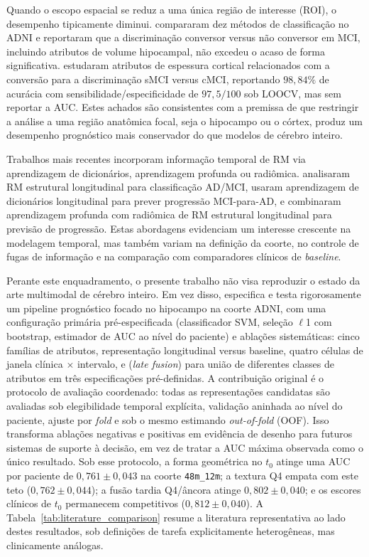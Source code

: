 \documentclass[review]{elsarticle}
\newcommand{\code}[1]{\texttt{#1}}
\begin{document}
	Quando o escopo espacial se reduz a uma única região de interesse (ROI), o desempenho tipicamente diminui. \citet{cuingnet-2011} compararam dez métodos de classificação no ADNI e reportaram que a discriminação conversor versus não conversor em MCI, incluindo atributos de volume hipocampal, não excedeu o acaso de forma significativa. \citet{guo-2017a} estudaram atributos de espessura cortical relacionados com a conversão para a discriminação sMCI versus cMCI, reportando $98,84\%$ de acurácia com sensibilidade/especificidade de $97,5/100$ sob LOOCV, mas sem reportar a AUC. Estes achados são consistentes com a premissa de que restringir a análise a uma região anatômica focal, seja o hipocampo ou o córtex, produz um desempenho prognóstico mais conservador do que modelos de cérebro inteiro.
	
	Trabalhos mais recentes incorporam informação temporal de RM via aprendizagem de dicionários, aprendizagem profunda ou radiômica. \citet{zhang-2019} analisaram RM estrutural longitudinal para classificação AD/MCI, \citet{lin-2020} usaram aprendizagem de dicionários longitudinal para prever progressão MCI-para-AD, e \citet{aghajanian-2025} combinaram aprendizagem profunda com radiômica de RM estrutural longitudinal para previsão de progressão. Estas abordagens evidenciam um interesse crescente na modelagem temporal, mas também variam na definição da coorte, no controle de fugas de informação e na comparação com comparadores clínicos de \textit{baseline}.
	
	Perante este enquadramento, o presente trabalho não visa reproduzir o estado da arte multimodal de cérebro inteiro. Em vez disso, especifica e testa rigorosamente um pipeline prognóstico focado no hipocampo na coorte ADNI, com uma configuração primária pré-especificada (classificador SVM, seleção $\ell$1 com bootstrap, estimador de AUC ao nível do paciente) e ablações sistemáticas: cinco famílias de atributos, representação longitudinal versus baseline, quatro células de janela clínica $\times$ intervalo, e (\emph{late fusion}) para união de diferentes classes de atributos em três especificações pré-definidas. A contribuição original é o protocolo de avaliação coordenado: todas as representações candidatas são avaliadas sob elegibilidade temporal explícita, validação aninhada ao nível do paciente, ajuste por \textit{fold} e sob o mesmo estimando \emph{out-of-fold} (OOF). Isso transforma ablações negativas e positivas em evidência de desenho para futuros sistemas de suporte à decisão, em vez de tratar a AUC máxima observada como o único resultado. Sob esse protocolo, a forma geométrica no $t_0$ atinge uma AUC por paciente de $0,761 \pm 0,043$ na coorte \code{48m\_12m}; a textura Q4 empata com este teto ($0,762 \pm 0,044$); a fusão tardia Q4/âncora atinge $0,802 \pm 0,040$; e os escores clínicos de $t_0$ permanecem competitivos ($0,812 \pm 0,040$). A Tabela~\ref{tab:literature_comparison} resume a literatura representativa ao lado destes resultados, sob definições de tarefa explicitamente heterogêneas, mas clinicamente análogas.
	
\end{document}

